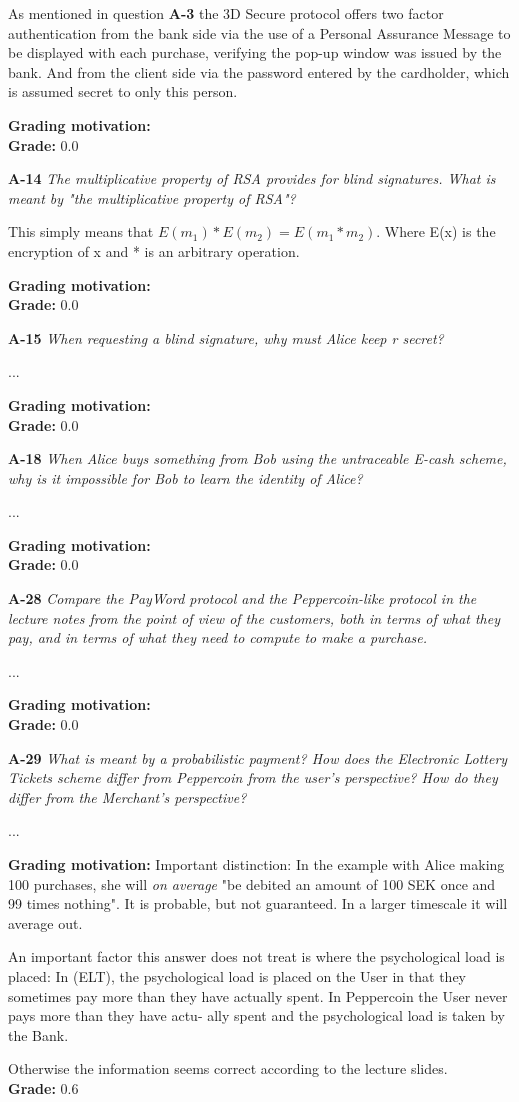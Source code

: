 \documentclass[a4paper]{article}
\newcommand{\Q}[2]{
  \textbf{#1} \textit{#2}
 }
\newcommand{\A}[1]{ #1 }
\newcommand{\Grade}[2]{ 
  \textbf{Grading motivation:} #2 \\ 
  \hspace*{\fill} \textbf{Grade:} #1 
}
\begin{document}
\A{
  As mentioned in question \textbf{A-3} the 3D Secure protocol offers two factor authentication from the bank side via the use of a Personal Assurance Message
  to be displayed with each purchase, verifying the pop-up window was issued by
  the bank. And from the client side via the password entered by the cardholder,
  which is assumed secret to only this person.
}

\Grade{0.0}{}

\Q{A-14} {The multiplicative property of RSA provides for blind signatures. What
is meant by "the multiplicative property of RSA"?}

\A{
  This simply means that $E(m_1) * E(m_2) = E(m_1 * m_2)$. Where E(x) is the
  encryption of x and * is an arbitrary operation.
}

\Grade{0.0}{}

\Q{A-15}{When requesting a blind signature, why must Alice keep r secret?}

\A{...}

\Grade{0.0}{}

\Q{A-18} {When Alice buys something from Bob using the untraceable E-cash
scheme, why is it impossible for Bob to learn the identity of Alice?}

\A{
  ...
}

\Grade{0.0}{}

\Q{A-28} {Compare the PayWord protocol and the Peppercoin-like protocol in the
lecture notes from the point of view of the customers, both in terms of what they
pay, and in terms of what they need to compute to make a purchase.}

\A{
  ...
}

\Grade{0.0}{}

\Q{A-29} {What  is  meant  by  a  probabilistic  payment?   How  does  the  
Electronic  Lottery  Tickets  scheme  differ from Peppercoin from the user's perspective?
How do they differ from the Merchant's perspective?}

\A{
  ...
}

\Grade{0.6}{
  Important distinction: In the example with Alice making 100 purchases, she will \textit{on average} "be debited an amount of 100 SEK once and 99 times
  nothing". It is probable, but not guaranteed. In a larger timescale it will average out.

  An important factor this answer does not treat is where the psychological load is placed: 
  In (ELT), the psychological load is placed on the User in that they sometimes pay more than they have
  actually spent. In Peppercoin the User never pays more than they have actu-
  ally spent and the psychological load is taken by the Bank.

  Otherwise the information seems correct according to the lecture slides.
}
\end{document}
